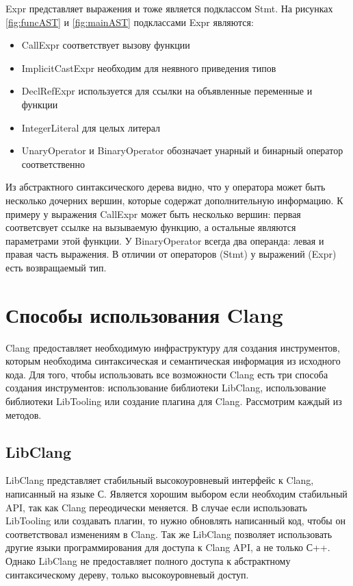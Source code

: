 Expr представляет выражения и тоже является подклассом Stmt. На рисунках \ref{fig:funcAST} и \ref{fig:mainAST}
подклассами Expr являются:
\begin{itemize}
 \item CallExpr соответствует вызову функции
 \item ImplicitCastExpr необходим для неявного приведения типов
 \item DeclRefExpr используется для ссылки на объявленные переменные и функции
 \item IntegerLiteral для целых литерал
 \item UnaryOperator и BinaryOperator обозначает унарный и бинарный оператор соответственно 
\end{itemize}
Из абстрактного синтаксического дерева видно, что у оператора может быть несколько дочерних
вершин, которые содержат дополнительную информацию. К примеру у выражения CallExpr может быть несколько вершин:
первая соответсвует ссылке на вызываемую функцию, а остальные являются параметрами этой функции.
У BinaryOperator всегда два операнда: левая и правая часть выражения. 
В отличии от операторов (Stmt) у выражений (Expr) есть возвращаемый тип.  

\section{Способы использования Clang}
Clang предоставляет необходимую инфраструктуру для создания инструментов, которым необходима
синтаксическая и семантическая информация из исходного кода. Для того, чтобы использовать все 
возможности Clang есть три способа создания инструментов: использование библиотеки LibClang, 
использование библиотеки LibTooling или создание плагина для Clang. Рассмотрим каждый из методов.

\subsection*{LibClang}
LibClang представляет стабильный высокоуровневый интерфейс к Clang, написанный на языке С. 
Является хорошим выбором если необходим стабильный API, так как Clang переодически меняется.
В случае если использовать LibTooling или создавать плагин, то нужно обновлять написанный код,
чтобы он соответствовал изменениям в Clang. Так же LibClang позволяет использовать другие языки
программирования для доступа к Clang API, а не только С++. Однако LibClang не предоставляет полного доступа к 
абстрактному синтаксическому дереву, только высокоуровневый доступ.

